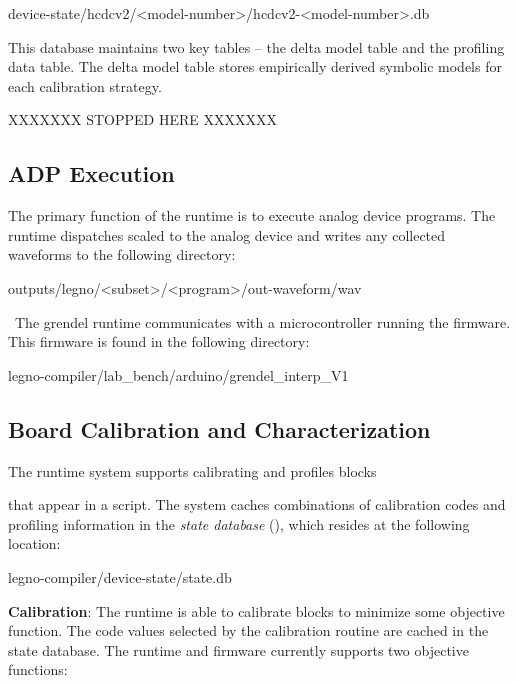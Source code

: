 \begin{snippet}
  device-state/hcdcv2/<model-number>/hcdcv2-<model-number>.db
\end{snippet}

This database maintains two key tables -- the delta model table and the
profiling data table. The delta model table stores empirically derived symbolic
models for each calibration strategy.

XXXXXXX STOPPED HERE XXXXXXX

\subsection{ADP Execution}

The primary function of the \grendel runtime is to execute analog device
programs. The \grendel runtime dispatches scaled  to the analog device and
writes any collected waveforms to the following directory:

\begin{snippet}
  outputs/legno/<subset>/<program>/out-waveform/wav
\end{snippet}

\noindent~The grendel runtime communicates with a microcontroller running the \grendel
firmware. This firmware is found in the following directory:

\begin{snippet}
  legno-compiler/lab_bench/arduino/grendel_interp_V1
\end{snippet}


\subsection{Board Calibration and Characterization}

The \grendel runtime system supports calibrating and profiles blocks

that appear
in a \grendel script. The system caches combinations of calibration codes and
profiling information in the \textit{state database} (), which
resides at the following location:

\begin{snippet}
  legno-compiler/device-state/state.db
\end{snippet}


\noindent\textbf{Calibration}: The \grendel runtime is able to calibrate blocks to
minimize some objective function. The code values selected by the calibration
routine are cached in the state database. The runtime and firmware currently supports
two objective functions:

